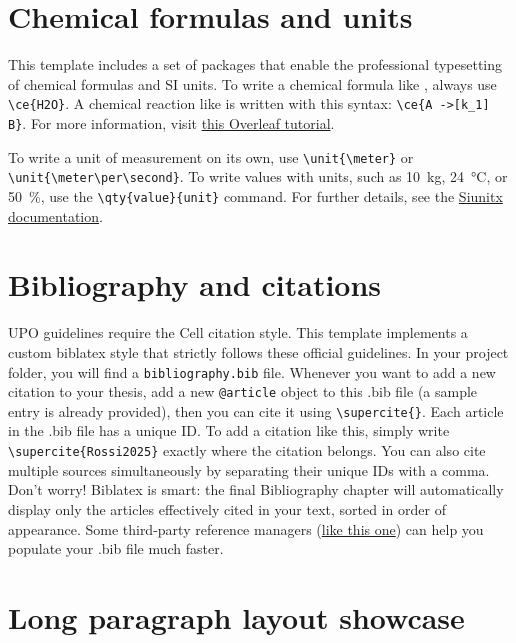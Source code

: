 \section{Chemical formulas and units}

This template includes a set of packages that enable the professional typesetting of chemical formulas and SI units. To write a chemical formula like , always use \Verb|\ce{H2O}|. A chemical reaction like  is written with this syntax: \Verb|\ce{A ->[k_1] B}|. For more information, visit \href{https://it.overleaf.com/learn/latex/Chemistry_formulae}{this Overleaf tutorial}.

To write a unit of measurement on its own, use \Verb|\unit{\meter}| or \Verb|\unit{\meter\per\second}|. To write values with units, such as \qty{10}{\kilo\gram}, \qty{24}{\celsius}, or \qty{50}{\percent}, use the \Verb|\qty{value}{unit}| command. For further details, see the \href{https://texdoc.org/serve/siunitx/0}{Siunitx documentation}.

\section{Bibliography and citations}

UPO guidelines require the Cell citation style. This template implements a custom biblatex style that strictly follows these official guidelines. In your project folder, you will find a \Verb|bibliography.bib| file. Whenever you want to add a new citation to your thesis, add a new \Verb|@article| object to this .bib file (a sample entry is already provided), then you can cite it using \Verb|\supercite{}|. Each article in the .bib file has a unique ID. To add a citation like this\supercite{Rossi2025}, simply write \Verb|\supercite{Rossi2025}| exactly where the citation belongs. You can also cite multiple sources simultaneously by separating their unique IDs with a comma. Don't worry! Biblatex is smart: the final Bibliography chapter will automatically display only the articles effectively cited in your text, sorted in order of appearance. Some third-party reference managers (\href{https://github.com/andreavalsesia/pubmed-to-bibtex.git}{like this one}) can help you populate your .bib file much faster.

\section{Long paragraph layout showcase}

\lipsum[1-4]